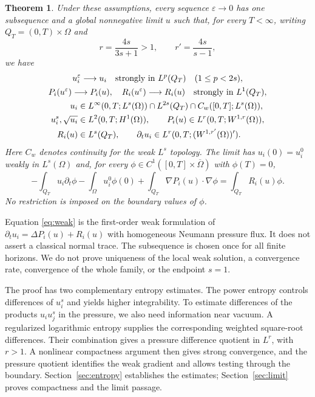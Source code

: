 \documentclass[11pt]{article}
\newtheorem{theorem}{Theorem}[section]
\newcommand{\eps}{\varepsilon}
\newcommand{\Om}{\Omega}
\begin{document}
\begin{theorem}\label{thm:main}
Under these assumptions, every sequence $\eps\to0$ has one subsequence and a
global nonnegative limit $u$ such that, for every $T<\infty$, writing
$Q_T=(0,T)\times\Om$ and
\[
 r=\frac{4s}{3s+1}>1,\qquad r'=\frac{4s}{s-1},
\]
we have
\begin{gather}
 u_i^\eps\longrightarrow u_i\quad\hbox{strongly in }L^p(Q_T)
       \quad(1\leq p<2s),\label{eq:conv}\\
 P_i(u^\eps)\longrightarrow P_i(u),\quad
 R_i(u^\eps)\longrightarrow R_i(u)\quad\hbox{strongly in }L^1(Q_T),
 \label{eq:productconv}\\
 \begin{aligned}
 u_i&\in L^\infty(0,T;L^s(\Om))\cap L^{2s}(Q_T)
                \cap C_w([0,T];L^s(\Om)),\\
 u_i^s,\sqrt{u_i}&\in L^2(0,T;H^1(\Om)),\qquad
 P_i(u)\in L^r(0,T;W^{1,r}(\Om)),\\
 R_i(u)&\in L^s(Q_T),\qquad
 \partial_tu_i\in L^r(0,T;(W^{1,r'}(\Om))').
 \end{aligned}\label{eq:regularity}
\end{gather}
Here $C_w$ denotes continuity for the weak $L^s$ topology. The limit has
$u_i(0)=u_i^0$ weakly in $L^s(\Om)$ and, for every
$\phi\in C^1([0,T]\times\overline\Om)$ with $\phi(T)=0$,
\begin{equation}\label{eq:weak}
 -\int_{Q_T}u_i\partial_t\phi-\int_\Om u_i^0\phi(0)
 +\int_{Q_T}\nabla P_i(u)\cdot\nabla\phi
 =\int_{Q_T}R_i(u)\phi.
\end{equation}
No restriction is imposed on the boundary values of $\phi$.
\end{theorem}

Equation \eqref{eq:weak} is the first-order weak formulation of
$\partial_tu_i=\Delta P_i(u)+R_i(u)$ with homogeneous Neumann pressure flux.
It does not assert a classical normal trace. The subsequence is chosen once
for all finite horizons. We do not prove uniqueness of the local weak solution,
a convergence rate, convergence of the whole family, or the endpoint $s=1$.

The proof has two complementary entropy estimates. The power entropy controls
differences of $u_i^s$ and yields higher integrability. To estimate differences
of the products $u_i u_j^s$ in the pressure, we also need information near
vacuum. A regularized logarithmic entropy supplies the corresponding weighted
square-root differences. Their combination gives a pressure difference
quotient in $L^r$, with $r>1$. A nonlinear compactness argument then gives
strong convergence, and the pressure quotient identifies the weak gradient
and allows testing through the boundary. Section~\ref{sec:entropy} establishes
the estimates; Section~\ref{sec:limit} proves compactness and the limit passage.
\end{document}
